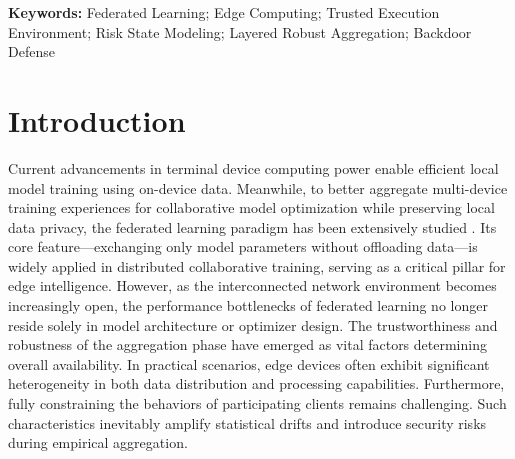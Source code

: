 \documentclass[runningheads,orivec]{llncs}
\begin{document}
\noindent\textbf{Keywords:} Federated Learning; Edge Computing; Trusted Execution Environment; Risk State Modeling; Layered Robust Aggregation; Backdoor Defense

\section{Introduction}

Current advancements in terminal device computing power enable efficient local model training using on-device data. Meanwhile, to better aggregate multi-device training experiences for collaborative model optimization while preserving local data privacy, the federated learning paradigm has been extensively studied \cite{kairouz2021flsurvey}. Its core feature—exchanging only model parameters without offloading data—is widely applied in distributed collaborative training, serving as a critical pillar for edge intelligence. However, as the interconnected network environment becomes increasingly open, the performance bottlenecks of federated learning no longer reside solely in model architecture or optimizer design. The trustworthiness and robustness of the aggregation phase have emerged as vital factors determining overall availability. In practical scenarios, edge devices often exhibit significant heterogeneity in both data distribution and processing capabilities. Furthermore, fully constraining the behaviors of participating clients remains challenging. Such characteristics inevitably amplify statistical drifts and introduce security risks during empirical aggregation.
\end{document}
